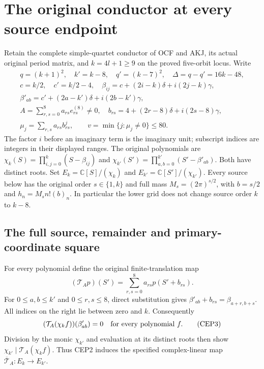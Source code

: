 \documentclass[11pt,a4paper]{article}
\begin{document}

\clearpage
\section{The original conductor at every source endpoint}
\label{sec:CEP}

Retain the complete simple-quartet conductor of OCF and AKJ, its
actual original period matrix, and $k=4l+1\ge9$ on the proved
five-orbit locus. Write
\[
 \begin{gathered}
 q=(k+1)^2,\quad k'=k-8,\quad q'=(k-7)^2,\quad
 \Delta=q-q'=16k-48,\\
 c=k/2,\quad c'=k/2-4,\quad
 \beta_{ij}=c+(2i-k)\delta+i(2j-k)\gamma,\\
 \beta'_{ab}=c'+(2a-k')\delta+i(2b-k')\gamma,\\
 A=\sum_{r,s=0}^8a_{rs}e_{rs}^{(8)}\ne0,\quad
 b_{rs}=4+(2r-8)\delta+i(2s-8)\gamma,\\
 \mu_j=\sum_{r,s}a_{rs}b_{rs}^j,\qquad
 v=\min\{j:\mu_j\ne0\}\le80.
 \end{gathered}\tag{CEP1}
\]
The factor $i$ before an imaginary term is the imaginary unit;
subscript indices are integers in their displayed ranges. The
original polynomials are
$\chi_k(S)=\prod_{i,j=0}^k(S-\beta_{ij})$ and
$\chi_{k'}(S')=\prod_{a,b=0}^{k'}(S'-\beta'_{ab})$.
Both have distinct roots. Set
$E_k=\mathbb C[S]/(\chi_k)$ and
$E_{k'}=\mathbb C[S']/(\chi_{k'})$.
Every source below has the original order $s\in\{1,k\}$ and
full mass $M_s=(2\pi)^{s/2}$, with $b=s/2$ and
$h_n=M_s n!(b)_n$. In particular the lower grid does not change
source order $k$ to $k-8$.

\subsection{The full source, remainder and primary-coordinate square}

For every polynomial define the original finite-translation map
\[
 (\mathcal T_Ap)(S')=\sum_{r,s=0}^8a_{rs}p(S'+b_{rs}).
 \tag{CEP2}
\]
For $0\le a,b\le k'$ and $0\le r,s\le8$, direct substitution gives
$\beta'_{ab}+b_{rs}=\beta_{a+r,b+s}$. All indices on the right lie
between zero and $k$. Consequently
\[
 (\mathcal T_A(\chi_k f))(\beta'_{ab})=0
 \quad\hbox{for every polynomial }f.
 \tag{CEP3}
\]
Division by the monic $\chi_{k'}$ and evaluation at its distinct roots
then show $\chi_{k'}\mid\mathcal T_A(\chi_k f)$. Thus CEP2 induces
the specified complex-linear map
$\overline{\mathcal T}_A:E_k\longrightarrow E_{k'}$.
\end{document}
